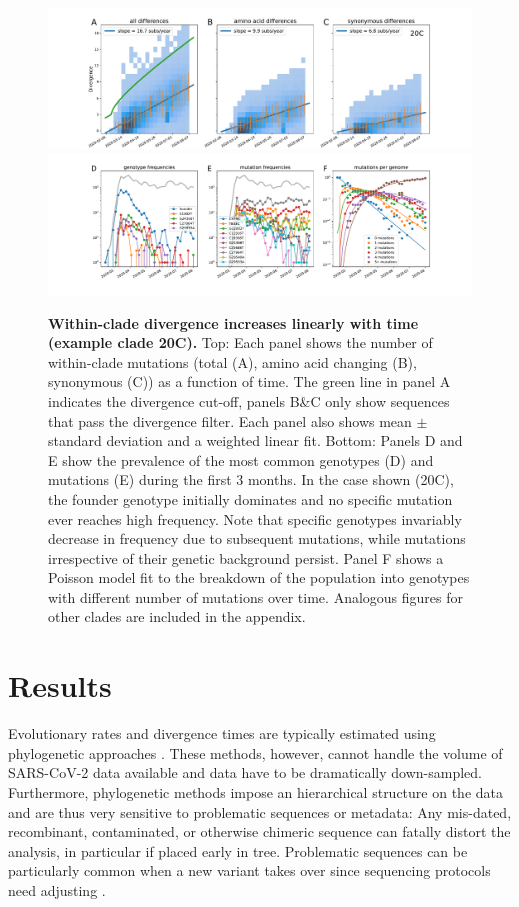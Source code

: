 \documentclass[aps,rmp, twocolumn]{revtex4}
\begin{document}
\begin{figure}[tb]
    \includegraphics[width=\textwidth]{figures/rtt/20C_rtt.pdf}
    \includegraphics[width=\textwidth]{figures/counts/20C_counts.pdf}
    \caption{{\bf Within-clade divergence increases linearly with time (example clade 20C).} Top: Each panel shows the number of within-clade mutations (total (A), amino acid changing (B), synonymous (C)) as a function of time.
    The green line in panel A indicates the divergence cut-off, panels B\&C only show sequences that pass the divergence filter. Each panel also shows mean $\pm$ standard deviation and a weighted linear fit.
    Bottom: Panels D and E show the prevalence of the most common genotypes (D) and mutations (E) during the first 3 months. In the case shown (20C), the founder genotype initially dominates and no specific mutation ever reaches high frequency. Note that specific genotypes invariably decrease in frequency due to subsequent mutations, while mutations irrespective of their genetic background persist. Panel F shows a Poisson model fit to the breakdown of the population into genotypes with different number of mutations over time. Analogous figures for other clades are included in the appendix.
    \label{fig:within_clade}}
\end{figure}

\section*{Results}

Evolutionary rates and divergence times are typically estimated using phylogenetic approaches \citep{drummond_relaxed_2006}.
These methods, however, cannot handle the volume of SARS-CoV-2 data available and data have to be dramatically down-sampled.
Furthermore, phylogenetic methods impose an hierarchical structure on the data and are thus very sensitive to problematic sequences or metadata: Any mis-dated, recombinant, contaminated, or otherwise chimeric sequence can fatally distort the analysis, in particular if placed early in tree.
Problematic sequences can be particularly common when a new variant takes over since sequencing protocols need adjusting \citep{deMaio_issues_2020}.
\end{document}

